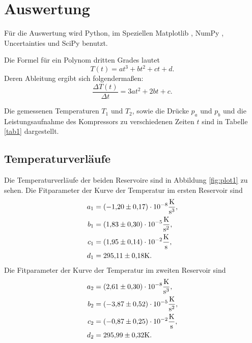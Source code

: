 \section{Auswertung}
\label{sec:Auswertung}
Für die Auswertung wird Python, im Speziellen Matplotlib \cite{matplotlib}, NumPy \cite{numpy}, Uncertainties \cite{uncertainties}
und SciPy \cite{scipy} benutzt.

\noindent Die Formel für ein Polynom dritten Grades lautet 
\begin{equation}
    T(t)= at^3+bt^2+ct+d.
    \label{eqn:poly3}
\end{equation}
Deren Ableitung ergibt sich folgendermaßen: 
\begin{equation}
    \frac{\Delta T(t)}{\Delta t}=3at^2+2bt+c.
    \label{eqn:poly3ableitung}
\end{equation}

\noindent Die gemessenen Temperaturen $T_1$ und $T_2$, sowie die Drücke
$p_a$ und $p_b$ und die Leistungsaufnahme des Kompressors
zu verschiedenen Zeiten $t$ sind in Tabelle \ref{tab1}
dargestellt.


\subsection{Temperaturverläufe}
Die Temperaturverläufe der beiden Reservoire sind in Abbildung
\ref{fig:plot1} zu sehen.
Die Fitparameter der Kurve der Temperatur im ersten Reservoir sind 
\begin{align*}
    a_1 &= \num{-1.20(17)e-8} \si{\kelvin\per\cubic\second},\\
    b_1 &= \num{1.83(30)e-5} \si{\kelvin\per\square\second},\\ 
    c_1 &= \num{1.95(14)e-2} \si{\kelvin\per\second}, \\
    d_1 &= \num{295.11 \pm 0.18} \si{\kelvin}. \\
\end{align*}
Die Fitparameter der Kurve der Temperatur im zweiten Reservoir sind 
\begin{align*}
    a_2 &= \num{2.61(30)e-8} \si{\kelvin\per\cubic\second},\\ 
    b_2 &= \num{-3.87(52)e-5} \si{\kelvin\per\square\second}, \\
    c_2 &= \num{-0.87(25)e-2} \si{\kelvin\per\second}, \\
    d_2 &= \num{295.99 \pm 0.32} \si{\kelvin}. \\
\end{align*}

